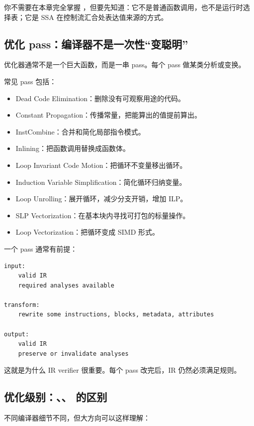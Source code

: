 你不需要在本章完全掌握 ，但要先知道：它不是普通函数调用，也不是运行时选择表；它是 SSA 在控制流汇合处表达值来源的方式。

\subsection{优化 pass：编译器不是一次性“变聪明”}

优化器通常不是一个巨大函数，而是一串 pass。每个 pass 做某类分析或变换。

常见 pass 包括：

\begin{itemize}
  \item Dead Code Elimination：删除没有可观察用途的代码。
  \item Constant Propagation：传播常量，把能算出的值提前算出。
  \item InstCombine：合并和简化局部指令模式。
  \item Inlining：把函数调用替换成函数体。
  \item Loop Invariant Code Motion：把循环不变量移出循环。
  \item Induction Variable Simplification：简化循环归纳变量。
  \item Loop Unrolling：展开循环，减少分支开销，增加 ILP。
  \item SLP Vectorization：在基本块内寻找可打包的标量操作。
  \item Loop Vectorization：把循环变成 SIMD 形式。
\end{itemize}

一个 pass 通常有前提：

\begin{lstlisting}
input:
    valid IR
    required analyses available

transform:
    rewrite some instructions, blocks, metadata, attributes

output:
    valid IR
    preserve or invalidate analyses
\end{lstlisting}

这就是为什么 IR verifier 很重要。每个 pass 改完后，IR 仍然必须满足规则。

\subsection{优化级别：、、 的区别}

不同编译器细节不同，但大方向可以这样理解：

